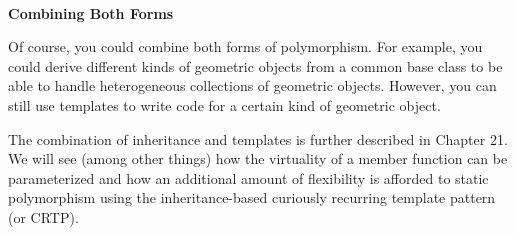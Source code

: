 \hspace*{\fill} \\ %
\noindent
\textbf{Combining Both Forms}

Of course, you could combine both forms of polymorphism. For example, you could derive different kinds of geometric objects from a common base class to be able to handle heterogeneous collections of geometric objects. However, you can still use templates to write code for a certain kind of geometric object.

The combination of inheritance and templates is further described in Chapter 21. We will see (among other things) how the virtuality of a member function can be parameterized and how an additional amount of flexibility is afforded to static polymorphism using the inheritance-based curiously recurring template pattern (or CRTP).




























